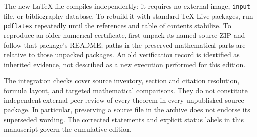 \documentclass[11pt,a4paper]{article}
\theoremstyle{definition}
\theoremstyle{remark}
\numberwithin{equation}{section}
\begin{document}
The new LaTeX file compiles independently: it requires no external image,
\texttt{input} file, or bibliography database. To rebuild it with standard
TeX Live packages, run \texttt{pdflatex} repeatedly until the references and
table of contents stabilize. To reproduce an older numerical certificate,
first unpack its named source ZIP and follow that package's README; paths
in the preserved mathematical parts are relative to those unpacked
packages. An old verification record is identified as inherited evidence,
not described as a new execution performed for this edition.

The integration checks cover source inventory, section and citation
resolution, formula layout, and targeted mathematical comparisons. They do
not constitute independent external peer review of every theorem in every
unpublished source package. In particular, preserving a source file in the
archive does not endorse its superseded wording. The corrected statements
and explicit status labels in this manuscript govern the cumulative
edition.
\end{document}
